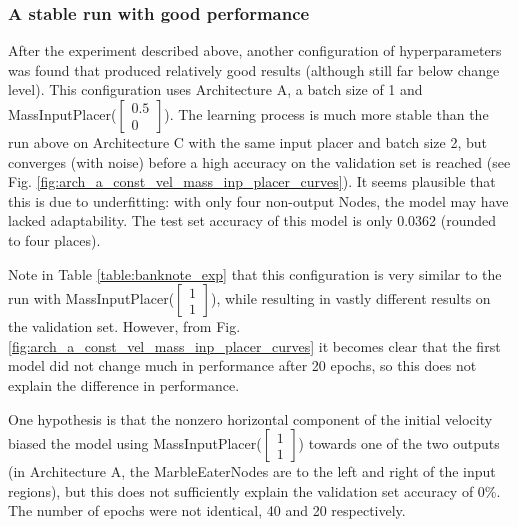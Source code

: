 \subsubsection{A stable run with good performance}
After the experiment described above, another configuration of hyperparameters was found that produced relatively good results 
(although still far below change level). 
This configuration uses Architecture A, a batch size of 1 and MassInputPlacer($\begin{bmatrix} 0.5\\0\end{bmatrix}$). 
The learning process is much more stable than the run above on Architecture C with the same input placer and batch size 2,
but converges (with noise) before a high accuracy on the validation set is reached (see Fig. \ref{fig:arch_a_const_vel_mass_inp_placer_curves}).
It seems plausible that this is due to underfitting: 
with only four non-output Nodes, the model may have lacked adaptability.
The test set accuracy of this model is only 0.0362 (rounded to four places).

Note in Table \ref{table:banknote_exp} that this configuration is very similar 
to the run with MassInputPlacer($\begin{bmatrix} 1\\1\end{bmatrix}$), 
while resulting in vastly different results on the validation set. 
However, from Fig. \ref{fig:arch_a_const_vel_mass_inp_placer_curves} 
it becomes clear that the first model did not change much in performance after 20 epochs,
so this does not explain the difference in performance.

One hypothesis is that the nonzero horizontal component of the initial velocity biased 
the model using MassInputPlacer($\begin{bmatrix} 1\\1\end{bmatrix}$) towards one of the two outputs (in Architecture A, 
the MarbleEaterNodes are to the left and right of the input regions), 
but this does not sufficiently explain the validation set accuracy of 0\%. 
The number of epochs were not identical, 40 and 20 respectively. 

